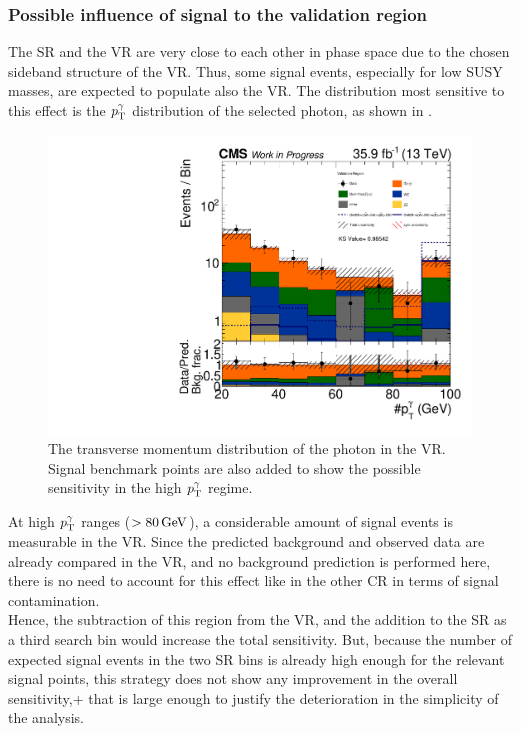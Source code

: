 \subsubsection*{Possible influence of signal to the validation region}
The SR and the VR are very close to each other in phase space due to the chosen sideband structure of the VR. Thus, some signal events, especially for low SUSY masses, are expected to populate also the VR. The distribution most sensitive to this effect is the $p_{\mathrm{T}}^{\gamma}$ distribution of the selected photon, as shown in .
\begin{figure}[tbp]
 \centering
 \includegraphics[width=\pairwidth]{figures/VR_signal_study/VR_LL_pt_g1_log}
 \caption{The transverse momentum distribution of the photon in the VR. Signal benchmark points are also added to show the possible sensitivity in the high $p_{\mathrm{T}}^{\gamma}$ regime.}
 \label{fig:signalContVR}
\end{figure}
At high $p_{\mathrm{T}}^{\gamma}$ ranges ($>80\,\text{Ge\hspace{-.08em}V}$), a considerable amount of signal events is measurable in the VR. Since the predicted background and observed data are already compared in the VR, and no background prediction is performed here, there is no need to account for this effect like in the other CR in terms of signal contamination.\\
Hence, the subtraction of this region from the VR, and the addition to the SR as a third search bin would increase the total sensitivity. But, because the number of expected signal events in the two SR bins is  already high enough for the relevant signal points, this strategy does not show any improvement in the overall sensitivity,+ that is large enough to justify the deterioration in the simplicity of the analysis.

